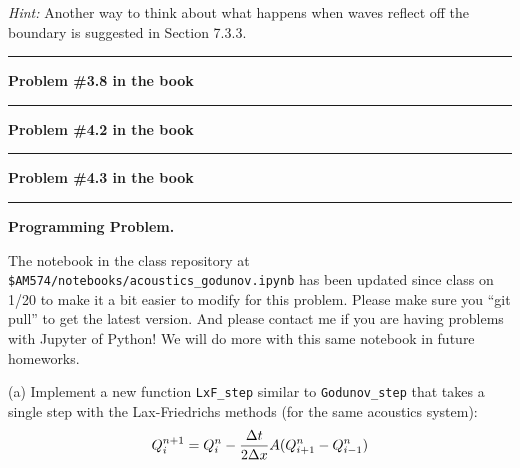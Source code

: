 \documentclass[11pt]{article}
\begin{document}

{\em Hint:} Another way to think about what happens when waves reflect off
the boundary is suggested in Section 7.3.3.







\vskip 1cm
\hrule
{\bf Problem \#3.8 in the book}





\vskip 1cm
\hrule
{\bf Problem \#4.2 in the book}






\vskip 1cm
\hrule
{\bf Problem \#4.3 in the book}






\vskip 1cm
\hrule
{\bf Programming Problem.}

The notebook in the class repository at 
{\tt \$AM574/notebooks/acoustics\_godunov.ipynb}
has been updated since class on 1/20 to make it a bit easier to modify for
this problem.  Please make sure you ``git pull'' to get the latest version.
And please contact me if you are having problems with Jupyter of Python!
We will do more with this same notebook in future homeworks.

\vskip 10pt
(a) Implement a new function {\tt LxF\_step} similar to {\tt Godunov\_step}
that takes a single step with the Lax-Friedrichs methods (for the same
acoustics system):  
\[
Q_i^{n+1} =  Q_i^{n} - \frac{\Delta t}{2\Delta x} A(Q_{i+1}^{n}-Q_{i-1}^{n})
\]
\end{document}
